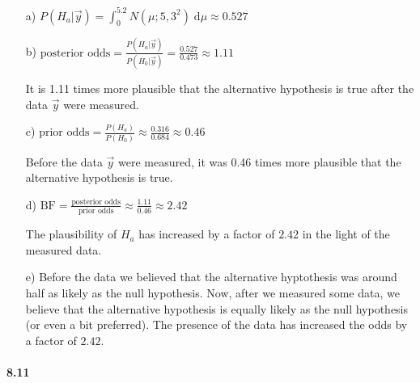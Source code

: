\documentclass[fontsize=11pt,DIV=18,parskip=half]{scrartcl}
\begin{document}
\begin{enumerate}
\item[a)] $P(H_a|\vec{y}) = \int_0^{5.2} N(\mu; 5, 3^2) \; \text{d}\mu \approx 0.527$
\item[b)] $\text{posterior odds} = \displaystyle{\frac{P(H_a|\vec{y})}{P(H_0|\vec{y})} = \frac{0.527}{0.473}} \approx 1.11$

It is 1.11 times more plausible that the alternative hypothesis is true after the data $\vec{y}$ were measured.
\item[c)] $\text{prior odds} = \displaystyle{\frac{P(H_a)}{P(H_0)} \approx \frac{0.316}{0.684}} \approx 0.46$

Before the data $\vec{y}$ were measured, it was 0.46 times more plausible that the alternative hypothesis is true.
\item[d)] $\text{BF} = \displaystyle{\frac{\text{posterior odds}}{\text{prior odds}} \approx \frac{1.11}{0.46}} \approx 2.42$

The plausibility of $H_a$ has increased by a factor of $2.42$ in the light of the measured data.

\item[e)] Before the data we believed that the alternative hyptothesis was around half as likely as the null hypothesis. Now, after we measured some data, we believe that the alternative hypothesis is equally likely as the null hypothesis (or even a bit preferred). The presence of the data has increased the odds by a factor of $2.42$.
\end{enumerate}

\paragraph{8.11}
\end{document}
